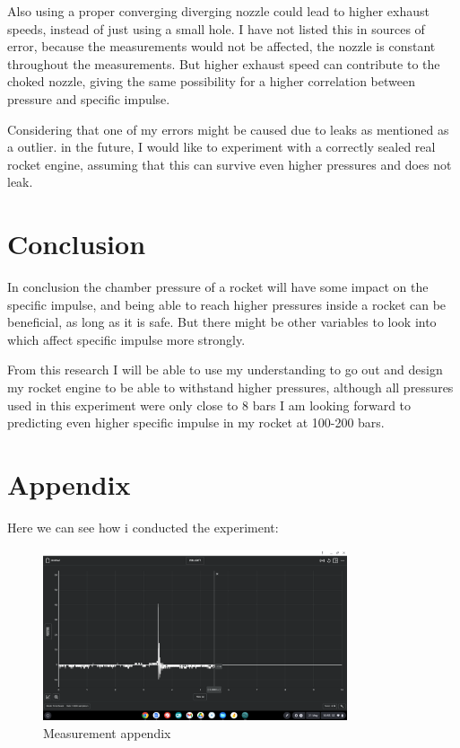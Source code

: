 \documentclass[12pt,a4paper]{article}
\begin{document}
Also using a proper converging diverging nozzle could lead to higher exhaust speeds, instead of just using a small hole. I have not listed this in sources of error, because the measurements would not be affected, the nozzle is constant throughout the measurements. But higher exhaust speed can contribute to the choked nozzle, giving the same possibility for a higher correlation between pressure and specific impulse.

Considering that one of my errors might be caused due to leaks as mentioned as a outlier. in the future, I would like to experiment with a correctly sealed real rocket engine, assuming that this can survive even higher pressures and does not leak.

\section{Conclusion}

In conclusion the chamber pressure of a rocket will have some impact on the specific impulse, and being able to reach higher pressures inside a rocket can be beneficial, as long as it is safe. But there might be other variables to look into which affect specific impulse more strongly.

From this research I will be able to use my understanding to go out and design my rocket engine to be able to withstand higher pressures, although all pressures used in this experiment were only close to 8 bars I am looking forward to predicting even higher specific impulse in my rocket at 100-200 bars.

\section{Appendix}

Here we can see how i conducted the experiment:

\begin{figure}[H]
\centering
\includegraphics[width=0.8\textwidth]{measering apendix.png}
\caption{Measurement appendix}
\label{fig:measurement_appendix}
\end{figure}
\end{document}
